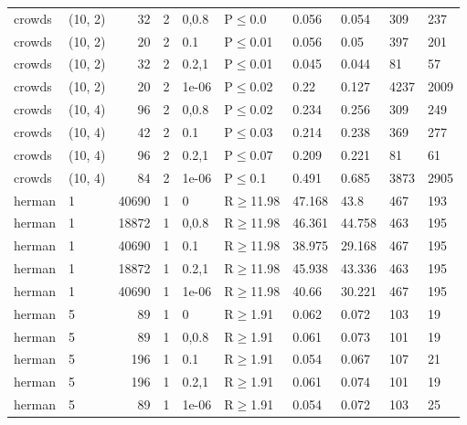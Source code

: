 \begin{longtable}{llrrllllll}
 crowds        & (10, 2)  &     	32 &   2 & 0,0.8 & P$\leq$0.0   & 0.056   & 0.054    & 309    & 237    \\
 crowds        & (10, 2)  &     	20 &   2 & 0.1   & P$\leq$0.01  & 0.056   & 0.05     & 397    & 201    \\
 crowds        & (10, 2)  &     	32 &   2 & 0.2,1 & P$\leq$0.01  & 0.045   & 0.044    & 81     & 57     \\
 crowds        & (10, 2)  &     	20 &   2 & 1e-06 & P$\leq$0.02  & 0.22    & 0.127    & 4237   & 2009   \\
 crowds        & (10, 4)  &     	96 &   2 & 0,0.8 & P$\leq$0.02  & 0.234   & 0.256    & 309    & 249    \\
 crowds        & (10, 4)  &     	42 &   2 & 0.1   & P$\leq$0.03  & 0.214   & 0.238    & 369    & 277    \\
 crowds        & (10, 4)  &     	96 &   2 & 0.2,1 & P$\leq$0.07  & 0.209   & 0.221    & 81     & 61     \\
 crowds        & (10, 4)  &     	84 &   2 & 1e-06 & P$\leq$0.1   & 0.491   & 0.685    & 3873   & 2905   \\
 herman        & 1        &  	40690 &   1 & 0     & R$\geq$11.98 & 47.168  & 43.8     & 467    & 193    \\
 herman        & 1        &  	18872 &   1 & 0,0.8 & R$\geq$11.98 & 46.361  & 44.758   & 463    & 195    \\
 herman        & 1        &  	40690 &   1 & 0.1   & R$\geq$11.98 & 38.975  & 29.168   & 467    & 195    \\
 herman        & 1        &  	18872 &   1 & 0.2,1 & R$\geq$11.98 & 45.938  & 43.336   & 463    & 195    \\
 herman        & 1        &  	40690 &   1 & 1e-06 & R$\geq$11.98 & 40.66   & 30.221   & 467    & 195    \\
 herman        & 5        &     	89 &   1 & 0     & R$\geq$1.91  & 0.062   & 0.072    & 103    & 19     \\
 herman        & 5        &     	89 &   1 & 0,0.8 & R$\geq$1.91  & 0.061   & 0.073    & 101    & 19     \\
 herman        & 5        &    	196 &   1 & 0.1   & R$\geq$1.91  & 0.054   & 0.067    & 107    & 21     \\
 herman        & 5        &    	196 &   1 & 0.2,1 & R$\geq$1.91  & 0.061   & 0.074    & 101    & 19     \\
 herman        & 5        &     	89 &   1 & 1e-06 & R$\geq$1.91  & 0.054   & 0.072    & 103    & 25     \\

\end{longtable}
